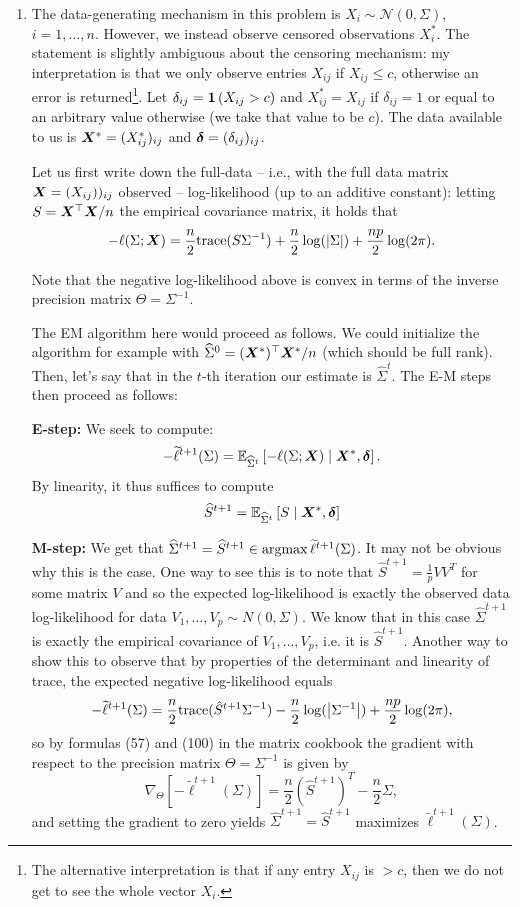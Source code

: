 \begin{enumerate}[label=(\alph*)]
\item  The data-generating mechanism in this problem is $X_i \sim \mathcal{N}(0, \Sigma)$, $i=1,\dotsc,n$.  However, we instead observe censored observations $X_i^*$. The statement is slightly ambiguous about the censoring mechanism: my interpretation is that we only observe entries $X_{ij}$ if $X_{ij} \leq c$, otherwise an error is returned\footnote{The alternative interpretation is that if any entry $X_{ij}$ is $>c$, then we do not get to see the whole vector $X_i$.}. Let $\delta_{ij} = \ind\p{X_{ij} > c}$  and $X_{ij}^* = X_{ij}$ if $\delta_{ij}=1$ or equal to an arbitrary value otherwise (we take that value to be $c$). The data available to us is $\boldX^* =(X_{ij}^*)_{ij}$ and $\bolddelta = (\delta_{ij})_{ij}$.

Let us first write down the full-data -- i.e., with the full data matrix $\boldX =(X_{ij}))_{ij}$ observed -- log-likelihood (up to an additive constant):  letting $S = \boldX^\top \boldX/n$ the empirical covariance matrix, it holds that
$$-\ell(\Sigma; \boldX) =   \frac{n}{2}\text{trace}(S \Sigma^{-1}) + \frac{n}{2} \log(\abs{\Sigma}) + \frac{np}{2} \log(2\pi).$$ 

Note that the negative log-likelihood above is convex in terms of the inverse precision matrix $\Theta = \Sigma^{-1}$.

The EM algorithm here would proceed as follows. We could initialize the algorithm for example with $\widehat{\Sigma}^0 = (\boldX^*)^\top \boldX^* /n$ (which should be full rank). Then, let's say that in the $t$-th iteration our estimate is $\widehat{\Sigma}^t$. The E-M steps then proceed as follows: 

\textbf{E-step:} We seek to compute: 
$$-\widetilde{\ell}^{t+1}(\Sigma) =  \EE[\widehat{\Sigma}^t]{-\ell(\Sigma; \boldX) \mid \boldX^*, \bolddelta}.$$
By linearity, it thus suffices to compute
$$\widehat{S}^{t+1} = \EE[\widehat{\Sigma}^t]{S \mid\boldX^*, \bolddelta}$$

\textbf{M-step:} We get that $\widehat{\Sigma}^{t+1} = \widehat{S}^{t+1} \in \argmax \widetilde{\ell}^{t+1}(\Sigma)$. It may not be obvious why this is the case. One way to see this is to note that  $\widehat{S}^{t+1} = \frac{1}{p}VV^T$ for some matrix $V$ and so the expected log-likelihood is exactly the observed data log-likelihood for data $V_1,\dots,V_p \sim N(0,\Sigma)$.  We know that in this case $\hat{\Sigma}^{t+1}$ is exactly the empirical covariance of $V_1,\dots,V_p$, i.e. it is $\widehat{S}^{t+1}$. Another way to show this to observe that by properties of the determinant and linearity of trace, the expected negative log-likelihood equals $$-\widetilde{\ell}^{t+1}(\Sigma) =\frac{n}{2}\text{trace}(\hat{S}^{t+1} \Sigma^{-1} ) - \frac{n}{2} \log(\abs{\Sigma^{-1}}) + \frac{np}{2} \log(2\pi),$$ so by formulas (57) and (100) in the matrix cookbook the gradient with respect to the precision matrix $\Theta = \Sigma^{-1}$ is given by $$\nabla_{\Theta} [-\widetilde{\ell}^{t+1}(\Sigma) ] =  \frac{n}{2} (\hat{S}^{t+1})^T  - \frac{n}{2} \Sigma,$$ and setting the gradient to zero yields $\widehat{\Sigma}^{t+1} = \widehat{S}^{t+1}$ maximizes $\widetilde{\ell}^{t+1}(\Sigma)$.



\end{enumerate}
